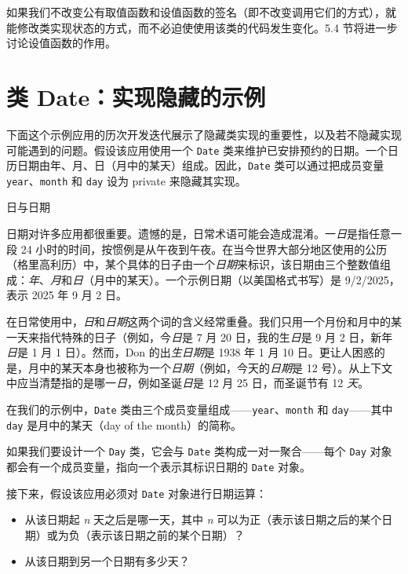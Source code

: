 如果我们不改变公有取值函数和设值函数的签名（即不改变调用它们的方式），就能修改类实现状态的方式，而不必迫使使用该类的代码发生变化。5.4 节将进一步讨论设值函数的作用。

\section{类 Date：实现隐藏的示例}

下面这个示例应用的历次开发迭代展示了隐藏类实现的重要性，以及若不隐藏实现可能遇到的问题。假设该应用使用一个 \texttt{Date} 类来维护已安排预约的日期。一个日历日期由年、月、日（月中的某天）组成。因此，\texttt{Date} 类可以通过把成员变量 \texttt{year}、\texttt{month} 和 \texttt{day} 设为 private 来隐藏其实现。

\begin{mySidebar}{日与日期}

日期对许多应用都很重要。遗憾的是，日常术语可能会造成混淆。一\emph{日}是指任意一段 24 小时的时间，按惯例是从午夜到午夜。在当今世界大部分地区使用的公历（格里高利历）中，某个具体的日子由一个\emph{日期}来标识，该日期由三个整数值组成：\emph{年}、\emph{月}和\emph{日}（月中的某天）。一个示例日期（以美国格式书写）是 9/2/2025，表示 2025 年 9 月 2 日。

在日常使用中，\emph{日}和\emph{日期}这两个词的含义经常重叠。我们只用一个月份和月中的某一天来指代特殊的日子（例如，今\emph{日}是 7 月 20 日，我的生\emph{日}是 9 月 2 日，新年\emph{日}是 1 月 1 日）。然而，Don 的出\emph{生日期}是 1938 年 1 月 10 日。更让人困惑的是，月中的某天本身也被称为一个\emph{日期}（例如，今天的\emph{日期}是 12 号）。从上下文中应当清楚指的是哪一\emph{日}，例如圣诞\emph{日}是 12 月 25 日，而圣诞节有 12 \emph{天}。

在我们的示例中，\texttt{Date} 类由三个成员变量组成——\texttt{year}、\texttt{month} 和 \texttt{day}——其中 \texttt{day} 是月中的某天（day of the month）的简称。

如果我们要设计一个 \texttt{Day} 类，它会与 \texttt{Date} 类构成一对一聚合——每个 \texttt{Day} 对象都会有一个成员变量，指向一个表示其标识日期的 \texttt{Date} 对象。
\end{mySidebar}

接下来，假设该应用必须对 \texttt{Date} 对象进行日期运算：

\begin{itemize}
\item 从该日期起 \emph{n} 天之后是哪一天，其中 \emph{n} 可以为正（表示该日期之后的某个日期）或为负（表示该日期之前的某个日期）？
\item 从该日期到另一个日期有多少天？
\end{itemize}

